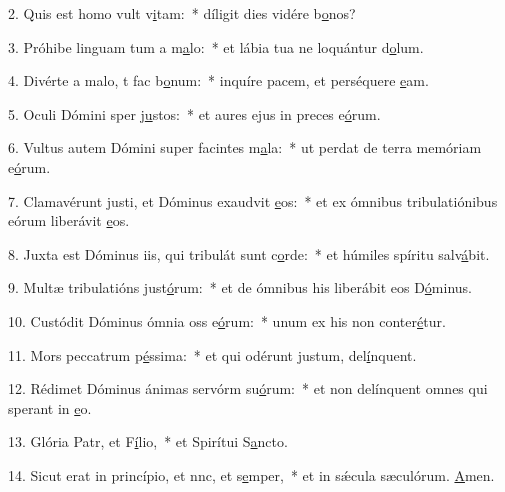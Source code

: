 2. Quis est homo  vult v\uline{i}tam:~* díligit dies vidére b\uline{o}nos?\par 
3. Próhibe linguam tum a m\uline{a}lo:~* et lábia tua ne loquántur d\uline{o}lum.\par 
4. Divérte a malo, t fac b\uline{o}num:~* inquíre pacem, et perséquere \uline{e}am.\par 
5. Oculi Dómini sper j\uline{u}stos:~* et aures ejus in preces e\uline{ó}rum.\par 
6. Vultus autem Dómini super facintes m\uline{a}la:~* ut perdat de terra memóriam e\uline{ó}rum.\par 
7. Clamavérunt justi, et Dóminus exaudvit \uline{e}os:~* et ex ómnibus tribulatiónibus eórum liberávit \uline{e}os.\par 
8. Juxta est Dóminus iis, qui tribulát sunt c\uline{o}rde:~* et húmiles spíritu salv\uline{á}bit.\par 
9. Multæ tribulatións just\uline{ó}rum:~* et de ómnibus his liberábit eos D\uline{ó}minus.\par 
10. Custódit Dóminus ómnia oss e\uline{ó}rum:~* unum ex his non conter\uline{é}tur.\par 
11. Mors peccatrum p\uline{é}ssima:~* et qui odérunt justum, del\uline{í}nquent.\par 
12. Rédimet Dóminus ánimas servórm su\uline{ó}rum:~* et non delínquent omnes qui sperant in \uline{e}o.\par 
13. Glória Patr, et F\uline{í}lio,~* et Spirítui S\uline{a}ncto.\par 
14. Sicut erat in princípio, et nnc, et s\uline{e}mper,~* et in sǽcula sæculórum. \uline{A}men.\par 
